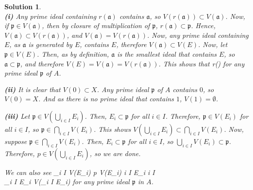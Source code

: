 \documentclass[11pt]{article}
\theoremstyle{plain}
\def\eQb#1\eQe{\begin{eqnarray*}#1\end{eqnarray*}}
\theoremstyle{quest}
\newtheorem*{solution}{Solution}
\begin{document}
\begin{solution} \hfill \\
\textbf{(i)} Any prime ideal containing $r(\mathfrak{a})$ contains $\mathfrak{a}$,
so $V(r(\mathfrak{a})) \subset V(\mathfrak{a})$. Now, if $\mathfrak{p} \in 
V(\mathfrak{a})$, then by closure of multiplication of $\mathfrak{p}$, $r(\mathfrak{a}) 
\subset \mathfrak{p}$. Hence, $V(\mathfrak{a}) \subset V(r(\mathfrak{a}))$, and
$V(\mathfrak{a}) = V(r(\mathfrak{a}))$. Now, any prime ideal containing $E$,
as $\mathfrak{a}$ is generated by $E$, contains $E$, therefore $V(\mathfrak{a}) 
\subset V(E)$. Now, let $\mathfrak{p} \in V(E)$. Then, as by definition, $\mathfrak{a}$
is the smallest ideal that contains $E$, so $\mathfrak{a} \subset \mathfrak{p}$, 
and therefore $V(E) = V(\mathfrak{a}) = V(r(\mathfrak{a}))$. This shows that
\eQb
E \subset {} \iff {} \subset {} \iff 
r() \subset {}
\eQe
for any prime ideal $\mathfrak{p}$ of $A$. \\  

\smallskip 

\noindent \textbf{(ii)} It is clear that $V(0) \subset X$. Any prime ideal $\mathfrak{p}$
of $A$ contains $0$, so $V(0) = X$. And as there is no prime ideal that contains
$1$, $V(1) = \emptyset$.  \\


\smallskip

\noindent \textbf{(iii)} Let $\mathfrak{p} \in V(\bigcup_{i \in I} E_i)$. Then,
$E_i \subset \mathfrak{p}$ for all $i \in I$. Therefore,
$\mathfrak{p} \in V(E_i)$ for all $i \in I$, so $\mathfrak{p} \in \bigcap_{i \in I}
V(E_i)$. This shows $V(\bigcup_{i \in I} E_i ) \subset \bigcap_{i \in I} 
V(E_i)$. Now, suppose $\mathfrak{p} \in \bigcap_{i \in I} V(E_i)$. Then,  
$E_i \subset \mathfrak{p}$ for all $i \in I$, so $\bigcup_{i \in I} V(E_i) 
\subset \mathfrak{p}$. Therefore, $p \in V(\bigcup_{i \in I} E_i)$, so we are done. \\

\smallskip

\noindent We can also see
\eQb
\mathfrak{p} \in \bigcap_{i \in I} V(E_i) \iff p \in V(E_i) \>\>\> \forall i \in I
\iff E_i \subset {} \>\>\> \forall i \in I \\
\iff \bigcup_{i \in I} E_i \subset {} \iff {} \in 
V(\bigcup_{i \in I} E_i) 
\eQe 
for any prime ideal $\mathfrak{p}$ in $A$. 

\smallskip


\end{solution}
\end{document}
